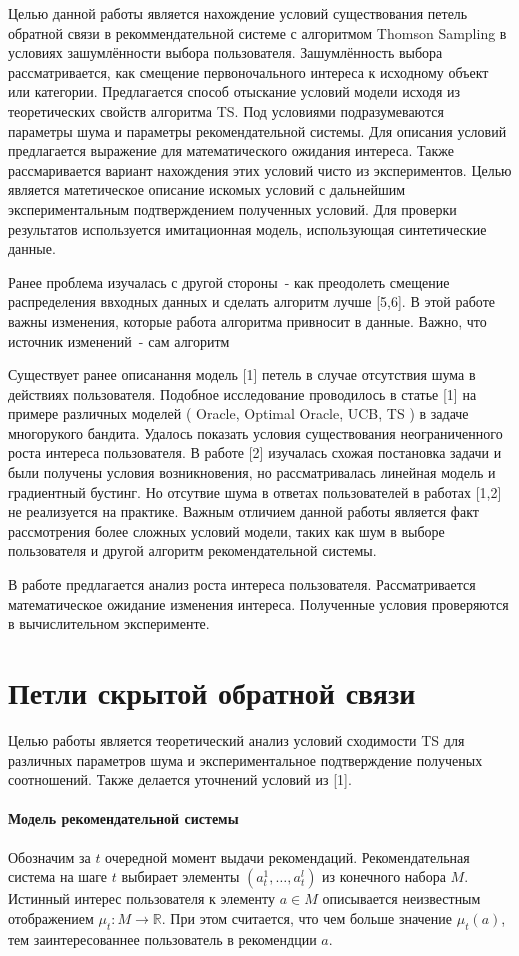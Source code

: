 \documentclass[12pt, twoside]{article}
\begin{document}
Целью данной работы является нахождение условий существования петель обратной связи в рекоммендательной системе с алгоритмом Thomson Sampling в условиях зашумлённости выбора пользователя.
Зашумлённость выбора рассматривается, как смещение первоночального интереса к исходному объект или категории.
Предлагается способ отыскание условий модели исходя из теоретических свойств алгоритма TS. 
Под условиями подразумеваются параметры шума и параметры рекомендательной системы. 
Для описания условий предлагается выражение для математического ожидания интереса.  
Также рассмаривается вариант нахождения этих условий чисто из экспериментов. 
Целью является матетическое описание искомых условий с дальнейшим экспериментальным подтверждением полученных условий.
Для проверки результатов используется имитационная модель, использующая синтетические данные.  

Ранее проблема изучалась с другой стороны~- как преодолеть смещение распределения ввходных данных и сделать алгоритм лучше [5,6]. 
В этой работе важны изменения, которые работа алгоритма привносит в данные. 
Важно, что источник изменений~- сам алгоритм

Существует ранее описанання модель [1] петель  в случае отсутствия шума в действиях пользователя.
Подобное исследование проводилось в статье [1] на примере различных моделей ( Oracle, Optimal Oracle, UCB,  TS ) в задаче многорукого бандита. 
Удалось показать условия существования неограниченного роста интереса пользователя. 
В работе [2] изучалась схожая постановка задачи и были получены условия возникновения, но рассматривалась линейная модель и градиентный бустинг. 
Но отсутвие шума в ответах пользователей в работах [1,2] не реализуется на практике. 
Важным отличием данной работы является факт рассмотрения более сложных условий модели, таких как шум в выборе пользователя и другой алгоритм рекомендательной системы.  

В работе предлагается анализ роста интереса пользователя.
Рассматривается математическое ожидание изменения интереса. 
Полученные условия проверяются в вычислительном эксперименте. 

\section{Петли скрытой обратной связи}
Целью работы является теоретический анализ условий сходимости TS для различных параметров шума и экспериментальное подтверждение полученых соотношений. 
Также делается уточнений условий из [1]. 
\paragraph{Модель рекомендательной системы}
Обозначим за $t$ очередной момент выдачи рекомендаций.
Рекомендательная система на шаге $t$ выбирает элементы $(a^1_t, \dots, a^l_t)$ из конечного набора $M$. 
Истинный $\textit{интерес}$ пользователя к элементу $a \in M$ описывается неизвестным отображением $\mu_t : M \to \mathbb{R}$. 
При этом считается, что чем больше значение $\mu_t (a)$, тем заинтересованнее пользователь в рекомендции $a$.
\end{document}

